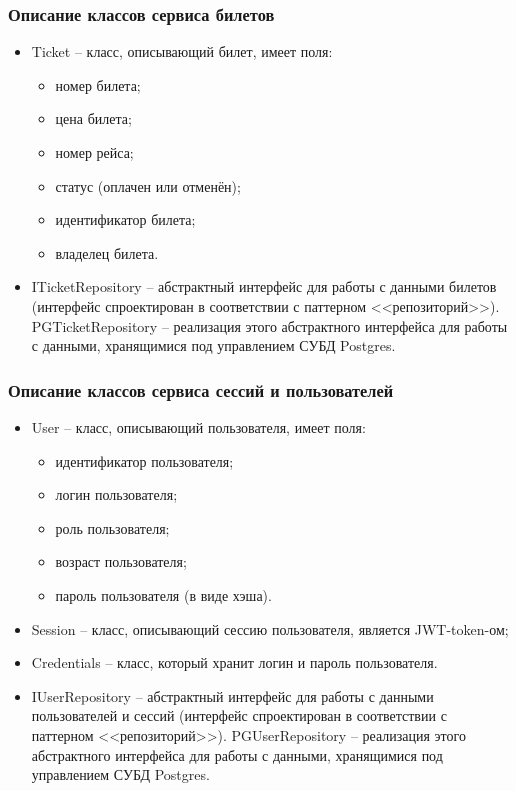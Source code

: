 \subsubsection{Описание классов сервиса билетов}

\begin{itemize}
    \item Ticket -- класс, описывающий билет, имеет поля:
    \begin{itemize}
        \item номер билета;
        \item цена билета;
        \item номер рейса;
        \item статус (оплачен или отменён);
        \item идентификатор билета;
        \item владелец билета.
    \end{itemize}
    \item ITicketRepository -- абстрактный интерфейс для работы с данными билетов (интерфейс спроектирован в соответствии с паттерном <<репозиторий>>). PGTicketRepository -- реализация этого абстрактного интерфейса для работы с данными, хранящимися под управлением СУБД Postgres.
\end{itemize}

\subsubsection{Описание классов сервиса сессий и пользователей}

\begin{itemize}
    \item User -- класс, описывающий пользователя, имеет поля:
    \begin{itemize}
        \item идентификатор пользователя;
        \item логин пользователя;
        \item роль пользователя;
        \item возраст пользователя;
        \item пароль пользователя (в виде хэша).
    \end{itemize}
    \item Session -- класс, описывающий сессию пользователя, является JWT-token-ом;
    \item Credentials -- класс, который хранит логин и пароль пользователя.
    \item IUserRepository -- абстрактный интерфейс для работы с данными пользователей и сессий (интерфейс спроектирован в соответствии с паттерном <<репозиторий>>). PGUserRepository -- реализация этого абстрактного интерфейса для работы с данными, хранящимися под управлением СУБД Postgres.
\end{itemize}

